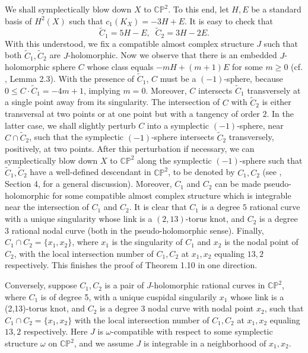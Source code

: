 \documentclass[11pt]{amsart}
\theoremstyle{plain}
\numberwithin{theorem}{section}
\theoremstyle{definition}
\newcommand{\C}{{\mathbb C}}
\renewcommand{\P}{{\mathbb P}}
\begin{document}
We shall symplectically blow down $X$ to $\C\P^2$. To this end, let $H,E$ be a standard basis 
of $H^2(X)$ such that $c_1(K_X)=-3H+E$. It is easy to check that
$$
\tilde{C}_1=5H-E,\;\; \tilde{C}_2=3H-2E.
$$
With this understood, we fix a compatible almost complex structure $J$ such that both 
$\tilde{C}_1,\tilde{C}_2$ are $J$-holomorphic. Now we observe that there is an embedded 
$J$-holomorphic sphere $C$ whose class equals $-mH+(m+1)E$ for some $m\geq 0$ (cf. \cite{C0}, Lemma 2.3). With the presence of $\tilde{C}_1$, $C$ must be a $(-1)$-sphere, because 
$0\leq C\cdot \tilde{C}_1=-4m+1$, implying $m=0$. Moreover, $C$ intersects $\tilde{C}_1$ transversely at a single point away from its singularity. The intersection of $C$ with $\tilde{C}_2$ is either transversal at two points or at one point but with a tangency of order $2$. In the latter case, 
we shall slightly perturb $C$ into a symplectic $(-1)$-sphere, near $C\cap \tilde{C}_2$, such that the symplectic $(-1)$-sphere intersects $\tilde{C}_2$ transversely, positively, at two points. After this perturbation if necessary, we can symplectically blow down $X$ to $\C\P^2$ along the symplectic 
$(-1)$-sphere such that $\tilde{C}_1,\tilde{C}_2$ have a well-defined descendant in $\C\P^2$, to be denoted by $C_1,C_2$ (see \cite{C2}, Section 4, for a general discussion). Moreover, $C_1$ and $C_2$ can be made pseudo-holomorphic for some compatible almost complex structure which is integrable near the intersection of $C_1$ and $C_2$. It is clear that $C_1$ is a degree $5$ rational curve with a unique singularity whose link is a $(2,13)$-torus knot, and $C_2$ is a degree $3$ 
rational nodal curve (both in the pseudo-holomorphic sense). Finally, $C_1\cap C_2=\{x_1,x_2\}$, where $x_1$ is the singularity of $C_1$ and $x_2$ is the nodal point of $C_2$, with the local intersection number of $C_1,C_2$ at $x_1, x_2$ equaling $13, 2$ respectively. This finishes the proof of Theorem 1.10 in one direction.

Conversely, suppose $C_1,C_2$ is a pair of $J$-holomorphic rational curves in $\C\P^2$, where
$C_1$ is of degree 5, with a unique cuspidal singularily $x_1$ whose link is a (2,13)-torus knot, and $C_2$ is a degree $3$ nodal curve with nodal point $x_2$, such that $C_1\cap C_2=\{x_1,x_2\}$
with the local intersection number of $C_1,C_2$ at $x_1, x_2$ equaling $13, 2$ respectively.
Here $J$ is $\omega$-compatible with respect to some symplectic structure $\omega$ on
$\C\P^2$, and we assume $J$ is integrable in a neighborhood of $x_1,x_2$. 
\end{document}
